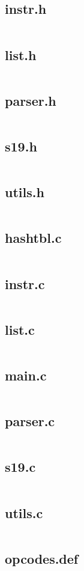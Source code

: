 \documentclass[a4paper,11pt]{article}
\begin{document}
        \subsection{instr.h}
            \inputminted{c}{../../src/instr.h}
        \subsection{list.h}
            \inputminted{c}{../../src/list.h}
        \subsection{parser.h}
            \inputminted{c}{../../src/parser.h}
        \subsection{s19.h}
            \inputminted{c}{../../src/s19.h}
        \subsection{utils.h}
            \inputminted{c}{../../src/utils.h}
        \subsection{hashtbl.c}
            \inputminted{c}{../../src/hashtbl.c}
        \subsection{instr.c}
            \inputminted{c}{../../src/instr.c}
        \subsection{list.c}
            \inputminted{c}{../../src/list.c}
        \subsection{main.c}
            \inputminted{c}{../../src/main.c}
        \subsection{parser.c}
            \inputminted{c}{../../src/parser.c}
        \subsection{s19.c}
            \inputminted{c}{../../src/s19.c}
        \subsection{utils.c}
            \inputminted{c}{../../src/utils.c}
        \subsection{opcodes.def}
            \inputminted{c}{../../src/opcodes.def}
\end{document}
